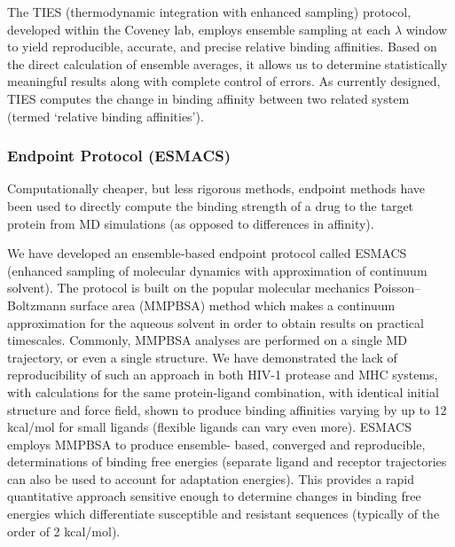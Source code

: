 \documentclass[conference]{IEEEtran}
\begin{document}
The TIES (thermodynamic integration with enhanced sampling) protocol,
developed within the Coveney lab, employs ensemble sampling at each $\lambda$
window to yield reproducible, accurate, and precise relative binding
affinities. \cite{ Wan2017brd4} Based on the direct calculation of ensemble
averages, it allows us to determine statistically meaningful results along
with complete control of errors. As currently designed, TIES computes the
change in binding affinity between two related system (termed ‘relative
binding affinities’).

\subsubsection{Endpoint Protocol (ESMACS)}\label{sec:esmacs}

Computationally cheaper, but less rigorous methods, endpoint methods have been
used to directly compute the binding strength of a drug to the target protein
from MD simulations (as opposed to differences in affinity).

We have developed an ensemble-based endpoint protocol called ESMACS (enhanced sampling of molecular dynamics with approximation of continuum solvent). The protocol is built on the popular molecular mechanics Poisson–Boltzmann surface area (MMPBSA) \cite{Massova1999} method which makes a continuum approximation for the aqueous solvent in order to obtain results on practical timescales. Commonly, MMPBSA analyses are performed on a single MD trajectory, or even a single structure. We have demonstrated the lack of reproducibility of such an approach in both HIV-1 protease and MHC systems, with calculations for the same protein-ligand combination, with identical initial structure and force field, shown to produce binding affinities varying by up to 12 kcal/mol for small ligands (flexible ligands can vary even more). \cite{Wan2015} ESMACS employs MMPBSA to produce ensemble- based, converged and reproducible, determinations of binding free energies (separate ligand and receptor trajectories can also be used to account for adaptation energies). This provides a rapid quantitative approach sensitive enough to determine changes in binding free energies which differentiate susceptible and resistant sequences (typically of the order of 2 kcal/mol).



\end{document}
